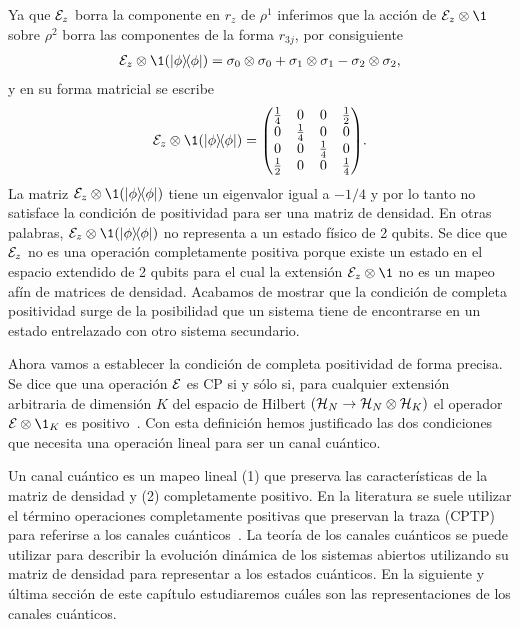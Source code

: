 Ya que $\mathcal{E}_z$ borra la componente en $r_z$ de $\rho^1$ inferimos 
que la acción de $\E_z\otimes\1$ sobre $\rho^2$ borra 
las componentes de la forma $r_{3j}$, por consiguiente
\begin{align}
\E_z\otimes\1 \qty(\dyad{\phi}{\phi})=
\pauli{0}{0}+\pauli{1}{1}-\pauli{2}{2},
\end{align}
y en su forma matricial se escribe
\begin{align}
\E_z\otimes\1 \qty(\dyad{\phi}{\phi})=
\mqty( 
\frac{1}{4} & 0 & 0 & \frac{1}{2} \\
0 & \frac{1}{4} & 0 & 0 \\
0 & 0 & \frac{1}{4} & 0 \\
\frac{1}{2} & 0 & 0 & \frac{1}{4} \\
).
\end{align}
La matriz  $\E_z\otimes\1\qty(\dyad{\phi}{\phi})$ tiene un 
eigenvalor igual a $-1/4$ y por lo tanto no satisface la condición 
de positividad para ser una matriz de densidad.  
En otras palabras, $\E_z\otimes\1\qty(\dyad{\phi}{\phi})$ 
no representa a un estado físico de 2 qubits.
Se dice que $\mathcal{E}_z$ no es una operación completamente 
positiva porque existe un estado en el espacio extendido de 2 qubits para 
el cual la extensión $\E_z\ot \1$ no es un mapeo afín de 
matrices de densidad. Acabamos de mostrar que la condición de completa
positividad surge de la posibilidad que un sistema tiene de encontrarse 
en un estado entrelazado con otro sistema secundario.

Ahora vamos a establecer la condición de completa positividad 
de forma precisa. Se dice que una operación $\mathcal{E}$ es CP si 
y sólo si, para cualquier extensión arbitraria de dimensión $K$ 
del espacio de Hilbert $(\mathcal{H}_N \rightarrow \mathcal{H}_N \otimes \mathcal{H}_K)$ 
el operador $\E\otimes\1_K$ es positivo~\cite{bengtsson_zyczkowski_2017}. 
Con esta definición hemos justificado las dos condiciones que 
necesita una operación lineal para ser un canal cuántico.

Un canal cuántico es un mapeo lineal  (1) que preserva las características
de la matriz de densidad y (2) completamente positivo. 
En la literatura se suele utilizar el término operaciones 
completamente positivas que preservan la traza 
(CPTP) para referirse a los canales 
cuánticos~\cite{bengtsson_zyczkowski_2017}. 
La teoría de los canales cuánticos se puede utilizar para 
describir la evolución dinámica de los sistemas abiertos 
utilizando su matriz de densidad para representar a los estados cuánticos.
En la siguiente y última sección de este capítulo estudiaremos 
cuáles son las representaciones de los canales cuánticos. 


